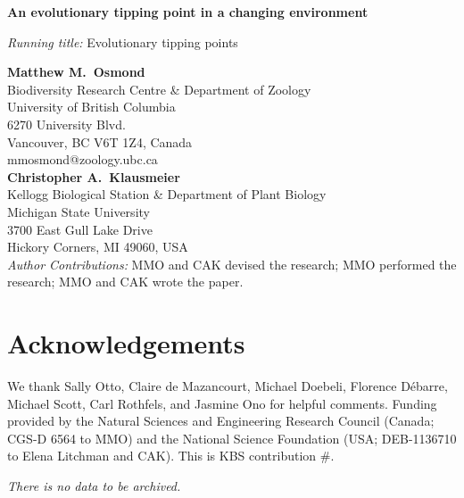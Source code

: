 \documentclass[12pt,letterpaper]{article} %
\begin{document}
\thispagestyle{empty}
\noindent\Large{\textbf{An evolutionary tipping point in a changing environment}} \vspace{0.5cm} %

\normalsize
\noindent \textit{Running title:} Evolutionary tipping points \vspace{0.5cm} %

\noindent \textbf{Matthew M.\ Osmond}\\
Biodiversity Research Centre \& Department of Zoology\\
University of British Columbia\\
6270 University Blvd. \\
Vancouver, BC V6T 1Z4, Canada\\
mmosmond@zoology.ubc.ca\\

\noindent \textbf{Christopher A.\ Klausmeier}\\
Kellogg Biological Station \& Department of Plant Biology\\
Michigan State University\\
3700 East Gull Lake Drive\\
Hickory Corners, MI 49060, USA\\

\vspace{0.5cm}
\noindent \textit{Author Contributions:} MMO and CAK devised the research; MMO performed the research; MMO and CAK wrote the paper.

\section*{Acknowledgements}

We thank Sally Otto, Claire de Mazancourt, Michael Doebeli, Florence D\'ebarre, Michael Scott, Carl Rothfels, and Jasmine Ono for helpful comments. 
Funding provided by the Natural Sciences and Engineering Research Council (Canada; CGS-D 6564 to MMO) and the National Science Foundation (USA; DEB-1136710 to Elena Litchman and CAK).
This is KBS contribution \#.

\vspace{0.5cm}
\noindent \textit{There is no data to be archived.}
\end{document}

